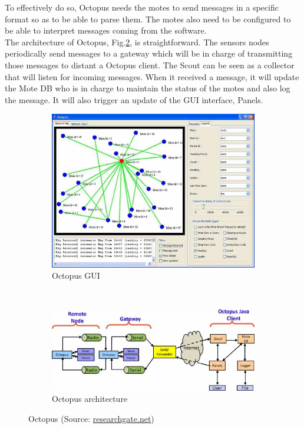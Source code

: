 To effectively do so, Octopus needs the motes to send messages in a specific format so as to be able to parse them. The motes also need to be configured to be able to interpret messages coming from the software.\\

The architecture of Octopus, Fig.\ref{fig:octopus_archi}, is straightforward. The sensors nodes periodically send messages to a gateway which will be in charge of transmitting those messages to distant a Octopus client. The Scout can be seen as a collector that will listen for incoming messages. When it received a message, it will update the Mote DB who is in charge to maintain the status of the motes and also log the message. It will also trigger an update of the GUI interface, Panels. \\

\begin{figure}
    \centering
    \begin{subfigure}[b]{0.5\textwidth}
      \includegraphics[width=\textwidth]{res/octopus.png}
      \caption{Octopus GUI}
      \label{fig:octopus_gui}
    \end{subfigure}
    ~
    \begin{subfigure}[b]{0.5\textwidth}
        \includegraphics[width=\textwidth]{res/octopus_archi.png}
        \caption{Octopus architecture}
        \label{fig:octopus_archi}
    \end{subfigure}
    \caption{Octopus (Source: \href{www.researchgate.net/publication/220098661_Octopus_Monitoring_visualization_and_control_of_sensor_networks}{researchgate.net})}
    \label{fig:octopus}
\end{figure}

